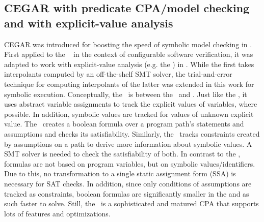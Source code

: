 \subsection*{CEGAR with predicate CPA/model checking and with explicit-value analysis}
CEGAR was introduced for boosting the speed of symbolic model checking in \cite{Clarke2003}.
First applied to the \predicateCPA\ \cite{Beyer2012} in the context of configurable software verification,
it was adapted to work with explicit-value analysis (e.g. the ) in \cite{Beyer2013}.
While the first takes interpolants computed by an off-the-shelf SMT solver, the trial-and-error technique
for computing interpolants of the latter was extended in this work for symbolic execution.
Conceptually, the \symbolicExecutionCPA\ is between the \ and \predicateCPA.
Just like the , it uses abstract variable assignments to track the explicit values of variables, where possible.
In addition, symbolic values are tracked for values of unknown explicit value.
The \predicateCPA\ creates a boolean formula over a program path's statements and assumptions and checks its satisfiability.
Similarly, the \symbolicExecutionCPA\ tracks constraints created by assumptions on a path to derive more information about symbolic values.
A SMT solver is needed to check the satisfiability of both.
In contrast to the \predicateCPA, formulas are not based on program variables, but on symbolic values/identifiers.
Due to this, no transformation to a single static assignment form (SSA) is necessary for SAT checks.
In addition, since only conditions of assumptions are tracked as constraints, boolean formulas are significantly smaller in the \symbolicExecutionCPA
and as such faster to solve.
Still, the \predicateCPA\ is a sophisticated and matured CPA that supports lots of features and optimizations.
